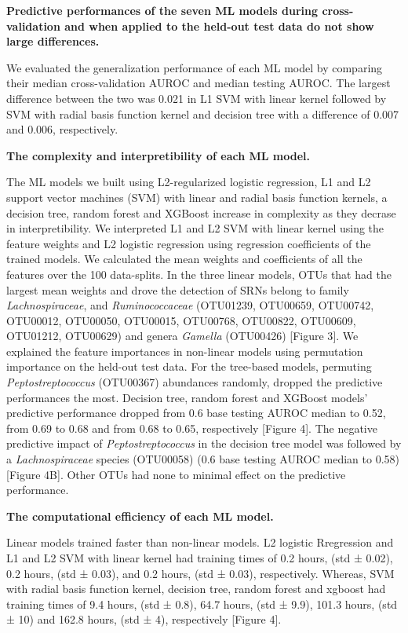 \documentclass[11pt,]{article}
\begin{document}
\textbf{Predictive performances of the seven ML models during
cross-validation and when applied to the held-out test data do not show
large differences.}

We evaluated the generalization performance of each ML model by
comparing their median cross-validation AUROC and median testing AUROC.
The largest difference between the two was 0.021 in L1 SVM with linear
kernel followed by SVM with radial basis function kernel and decision
tree with a difference of 0.007 and 0.006, respectively.

\textbf{The complexity and interpretibility of each ML model.}

The ML models we built using L2-regularized logistic regression, L1 and
L2 support vector machines (SVM) with linear and radial basis function
kernels, a decision tree, random forest and XGBoost increase in
complexity as they decrase in interpretibility. We interpreted L1 and L2
SVM with linear kernel using the feature weights and L2 logistic
regression using regression coefficients of the trained models. We
calculated the mean weights and coefficients of all the features over
the 100 data-splits. In the three linear models, OTUs that had the
largest mean weights and drove the detection of SRNs belong to family
\emph{Lachnospiraceae}, and \emph{Ruminococcaceae} (OTU01239, OTU00659,
OTU00742, OTU00012, OTU00050, OTU00015, OTU00768, OTU00822, OTU00609,
OTU01212, OTU00629) and genera \emph{Gamella} (OTU00426) {[}Figure 3{]}.
We explained the feature importances in non-linear models using
permutation importance on the held-out test data. For the tree-based
models, permuting \emph{Peptostreptococcus} (OTU00367) abundances
randomly, dropped the predictive performances the most. Decision tree,
random forest and XGBoost models' predictive performance dropped from
0.6 base testing AUROC median to 0.52, from 0.69 to 0.68 and from 0.68
to 0.65, respectively {[}Figure 4{]}. The negative predictive impact of
\emph{Peptostreptococcus} in the decision tree model was followed by a
\emph{Lachnospiraceae} species (OTU00058) (0.6 base testing AUROC median
to 0.58) {[}Figure 4B{]}. Other OTUs had none to minimal effect on the
predictive performance.

\textbf{The computational efficiency of each ML model.}

Linear models trained faster than non-linear models. L2 logistic
Rregression and L1 and L2 SVM with linear kernel had training times of
0.2 hours, (std ± 0.02), 0.2 hours, (std ± 0.03), and 0.2 hours, (std ±
0.03), respectively. Whereas, SVM with radial basis function kernel,
decision tree, random forest and xgboost had training times of 9.4
hours, (std ± 0.8), 64.7 hours, (std ± 9.9), 101.3 hours, (std ± 10) and
162.8 hours, (std ± 4), respectively {[}Figure 4{]}.
\end{document}
